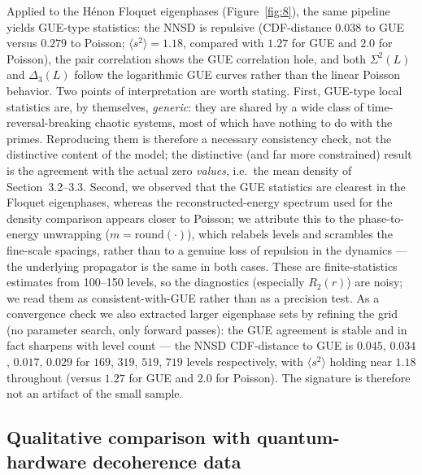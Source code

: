 \documentclass[utf8]{FrontiersinHarvard}
\begin{document}
Applied to the Hénon Floquet eigenphases (Figure~\ref{fig:8}), the same pipeline yields GUE-type statistics: the NNSD is repulsive (CDF-distance $0.038$ to GUE versus $0.279$ to Poisson; $\langle s^2\rangle = 1.18$, compared with $1.27$ for GUE and $2.0$ for Poisson), the pair correlation shows the GUE correlation hole, and both $\Sigma^2(L)$ and $\Delta_3(L)$ follow the logarithmic GUE curves rather than the linear Poisson behavior. Two points of interpretation are worth stating. First, GUE-type local statistics are, by themselves, \emph{generic}: they are shared by a wide class of time-reversal-breaking chaotic systems, most of which have nothing to do with the primes. Reproducing them is therefore a necessary consistency check, not the distinctive content of the model; the distinctive (and far more constrained) result is the agreement with the actual zero \emph{values}, i.e.\ the mean density of Section~3.2--3.3. Second, we observed that the GUE statistics are clearest in the Floquet eigenphases, whereas the reconstructed-energy spectrum used for the density comparison appears closer to Poisson; we attribute this to the phase-to-energy unwrapping ($m=\mathrm{round}(\cdot)$), which relabels levels and scrambles the fine-scale spacings, rather than to a genuine loss of repulsion in the dynamics --- the underlying propagator is the same in both cases. These are finite-statistics estimates from 100--150 levels, so the diagnostics (especially $R_2(r)$) are noisy; we read them as consistent-with-GUE rather than as a precision test. As a convergence check we also extracted larger eigenphase sets by refining the grid (no parameter search, only forward passes): the GUE agreement is stable and in fact sharpens with level count --- the NNSD CDF-distance to GUE is $0.045$, $0.034$, $0.017$, $0.029$ for $169$, $319$, $519$, $719$ levels respectively, with $\langle s^2\rangle$ holding near $1.18$ throughout (versus $1.27$ for GUE and $2.0$ for Poisson). The signature is therefore not an artifact of the small sample.

\subsection{Qualitative comparison with quantum-hardware decoherence data}
\end{document}
